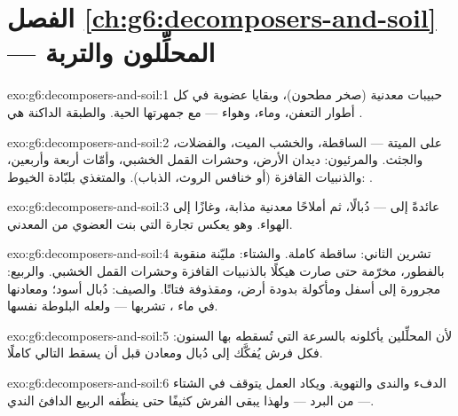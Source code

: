 \section*{الفصل \ref{ch:g6:decomposers-and-soil} --- المحلِّلون والتربة}

\begin{solution}{exo:g6:decomposers-and-soil:1}
حبيبات معدنية (صخر مطحون)، وبقايا عضوية في كل أطوار التعفن، وماء،
وهواء --- مع جمهرتها الحية. والطبقة الداكنة هي .
\end{solution}

\begin{solution}{exo:g6:decomposers-and-soil:2}
على  الميتة ---  الساقطة، والخشب الميت،
والفضلات، والجثث. والمرئيون: ديدان الأرض، وحشرات القمل الخشبي،
وأمّات أربعة وأربعين، والذنبيات القافزة (أو خنافس الروث، 
الذباب). والمتغذي بلبّادة الخيوط: .
\end{solution}

\begin{solution}{exo:g6:decomposers-and-soil:3}
عائدةً إلى  --- دُبالًا، ثم أملاحًا معدنية مذابة، وغازًا
إلى الهواء. وهو يعكس تجارة  التي بنت العضوي من المعدني.
\end{solution}

\begin{solution}{exo:g6:decomposers-and-soil:4}
تشرين الثاني: ساقطة كاملة. والشتاء: مليّنة منقوبة بالفطور، مخرّمة
حتى صارت هيكلًا بالذنبيات القافزة وحشرات القمل الخشبي. والربيع:
مجرورة إلى أسفل ومأكولة بدودة أرض، ومقذوفة فتاتًا. والصيف: دُبال
أسود؛ ومعادنها في ماء ، تشربها  --- ولعله  البلوطة
نفسها.
\end{solution}

\begin{solution}{exo:g6:decomposers-and-soil:5}
لأن المحلِّلين يأكلونه بالسرعة التي تُسقطه بها السنون: فكل فرش
يُفكَّك إلى دُبال ومعادن قبل أن يسقط التالي كاملًا.
\end{solution}

\begin{solution}{exo:g6:decomposers-and-soil:6}
الدفء والندى والتهوية. ويكاد العمل يتوقف في الشتاء --- من البرد
--- ولهذا يبقى الفرش كثيفًا حتى ينظّفه الربيع الدافئ الندي.
\end{solution}

